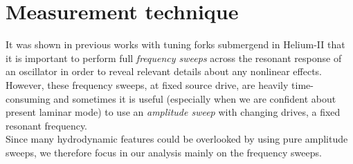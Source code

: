 \section{Measurement technique}

It was shown in previous works \cite{svoc2016} \cite{fork-exp}  with tuning forks submergend in Helium-II that it is important to perform full \textit{frequency sweeps} across the resonant response of an oscillator in order to reveal relevant details about any nonlinear effects.\\
However, these frequency sweeps, at fixed source drive, are heavily time-consuming and sometimes it is useful (especially when we are confident about present laminar mode) to use an \textit{amplitude sweep} with changing drives, a fixed resonant frequency.\\
Since many hydrodynamic features could be overlooked by using pure amplitude sweeps, we therefore focus in our analysis mainly on the frequency sweeps.


\newpage

